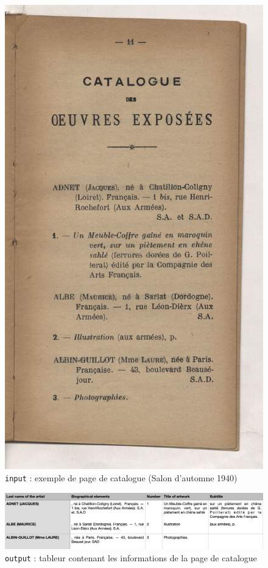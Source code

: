 \documentclass[a4paper,12pt,twoside]{book}
\begin{document}
	\begin{figure}[ht]
	\centering
	\includegraphics[scale=0.7]{image_1}		
	\caption{\texttt{input} : exemple de page de catalogue (Salon d'automne 1940)}
	\label{page11}
\end{figure}

\begin{figure}[ht]
	\centering
	\includegraphics[scale=0.5]{tableau_automne}		
	\caption{\texttt{output} : tableur contenant les informations de la page de catalogue}
	\label{tableur11}
\end{figure}
\end{document}
